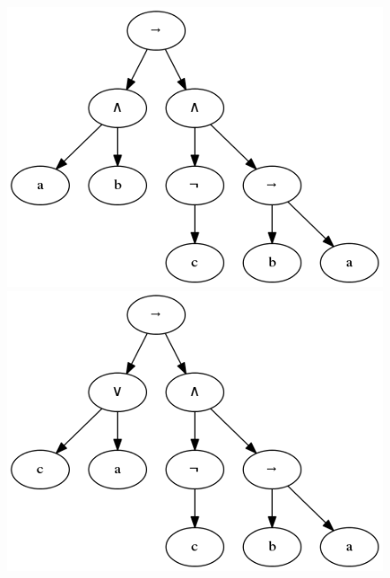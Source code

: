 \documentclass[12pt,fleqn]{article}
\begin{document}
\FloatBarrier

\begin{figure}[!h]%
  \centering
  \begin{minipage}{2in}%
    \centering
    \includegraphics[scale=0.3]{t7.png}
  \end{minipage}%
  \qquad
  \begin{minipage}{2in}%
    \centering
    \includegraphics[scale=0.3]{t8.png}
  \end{minipage}%
\end{figure}
\end{document}
